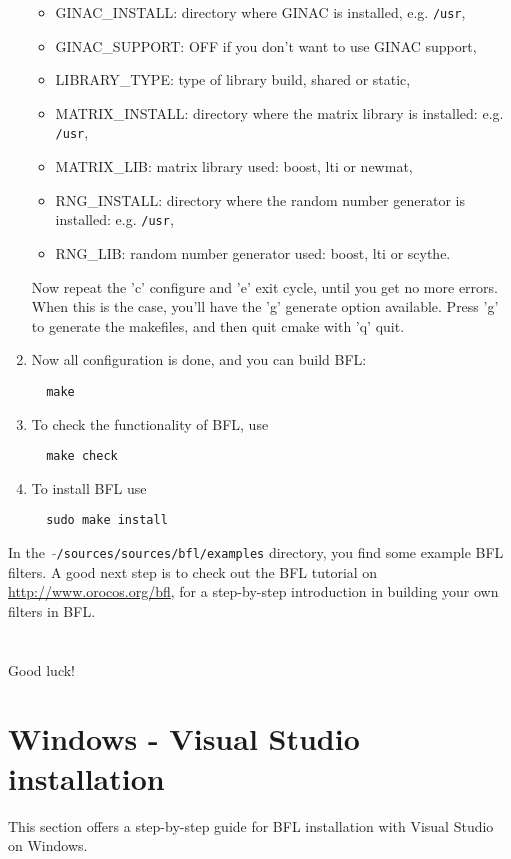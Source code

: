 \documentclass[a4paper,10pt]{article}
\begin{document}
\begin{enumerate}
\begin{itemize}
 \item GINAC\_INSTALL: directory where GINAC is installed, e.g. \texttt{/usr},
 \item GINAC\_SUPPORT: OFF if you don't want to use GINAC support,
 \item LIBRARY\_TYPE: type of library build, shared or static,
 \item MATRIX\_INSTALL: directory where the matrix library is installed: e.g. \texttt{/usr},
 \item MATRIX\_LIB: matrix library used: boost, lti or newmat,
 \item RNG\_INSTALL: directory where the random number generator is installed: e.g. \texttt{/usr},
 \item RNG\_LIB: random number generator used: boost, lti or scythe.
\end{itemize}
Now repeat the 'c' configure and 'e' exit cycle, until you get no more
errors. When this is the case, you'll have the 'g' generate option
available. Press 'g' to generate the makefiles, and then quit cmake
with 'q' quit.
\item Now all configuration is done, and you can build BFL:
\begin{verbatim}
  make 
\end{verbatim}	
\item To check the functionality of BFL, use
\begin{verbatim}
  make check
\end{verbatim}	
\item To install BFL use
\begin{verbatim}
  sudo make install
\end{verbatim}
\end{enumerate}
In the \ $\mathtt{\tilde{ }}$\texttt{/sources/sources/bfl/examples} directory, you find some example BFL
filters. A good next step is to check out the BFL tutorial on
\url{http://www.orocos.org/bfl}, for a step-by-step introduction in building
your own filters in BFL.
\\\\\\
Good luck!



\section{Windows - Visual Studio installation}
\label{sec:windows}
This section offers a step-by-step guide for BFL installation with Visual Studio on Windows.
\end{document}
